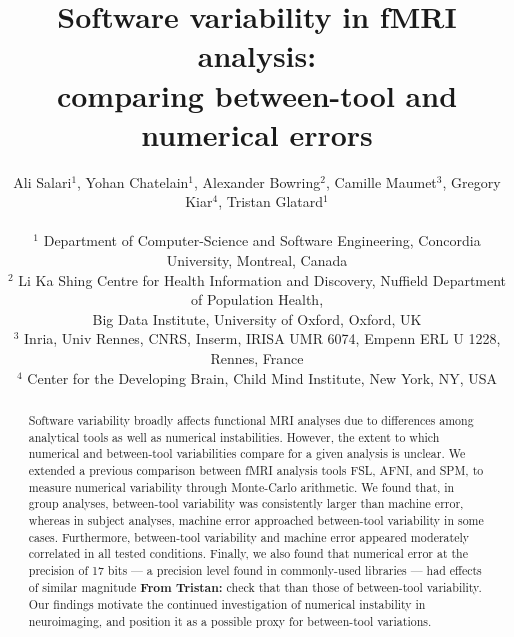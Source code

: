 \documentclass[11pt,onecolumn]{article}
\begin{document}
\newcommand{\fslspm}{FSL-SPM\xspace}
\newcommand{\fslafni}{FSL-AFNI\xspace}
\newcommand{\afnispm}{AFNI-SPM\xspace}
\newcommand{\tristan}[1]{\color{orange}\textbf{From Tristan:} #1\color{black}\xspace}
\newcommand{\ali}[2]{\color{green}\textbf{Ali:} #1\color{black}\xspace}
\newcommand{\discuss}[1]{\uwave{#1}}


\title{Software variability in fMRI analysis:\\ comparing between-tool and numerical errors}

\author{Ali Salari$^1$, Yohan Chatelain$^1$, Alexander Bowring$^2$, Camille Maumet$^3$, Gregory Kiar$^4$, Tristan Glatard$^1$\\
\vspace*{0.1cm}\\
$^1$ Department of Computer-Science and Software Engineering, Concordia University, Montreal, Canada\\
$^2$ Li Ka Shing Centre for Health Information and Discovery, Nuffield Department of Population Health,\\ Big Data Institute, University of Oxford, Oxford, UK\\
$^3$ Inria, Univ Rennes, CNRS, Inserm, IRISA UMR 6074, Empenn ERL U 1228, Rennes, France\\
$^4$ Center for the Developing Brain, Child Mind Institute, New York, NY, USA}

\maketitle
\begin{abstract}

Software variability broadly affects functional MRI analyses due to
differences among analytical tools as well as numerical instabilities. However,
the extent to which numerical and between-tool variabilities compare for a
given analysis is unclear. We extended a previous comparison
between fMRI analysis tools FSL, AFNI, and SPM, to measure numerical
variability through Monte-Carlo arithmetic. We found that, in group analyses,
between-tool variability was consistently larger than machine error,
whereas in subject analyses, machine error approached between-tool
variability in some cases. Furthermore, between-tool variability and
machine error appeared moderately correlated in all tested conditions.
Finally, we also found that numerical error at the precision of 17 bits --- a
precision level found in commonly-used libraries --- had effects of similar
magnitude \tristan{check that} than those of between-tool variability. Our findings motivate the
continued investigation of numerical instability in neuroimaging, and position it 
as a possible proxy for between-tool variations.
\end{abstract}
\end{document}
